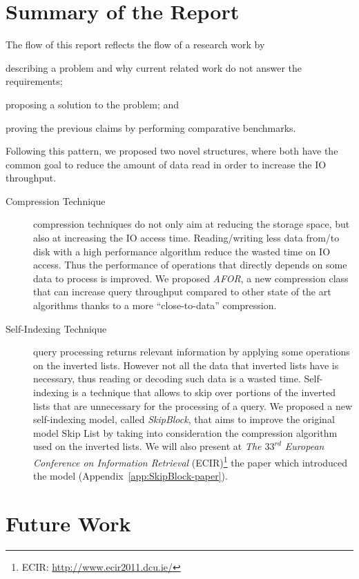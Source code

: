 \section{Summary of the Report}

The flow of this report reflects the flow of a research work by
\begin{inparaenum}[(1)]
\item describing a problem and why current related work do not answer the
requirements;
\item proposing a solution to the problem; and
\item proving the previous claims by performing comparative benchmarks.
\end{inparaenum}
Following this pattern, we proposed two novel structures, where both have the
common goal to reduce the amount of data read in order to increase the IO
throughput. 
\begin{description}
\item[Compression Technique] compression techniques do not only aim at reducing
the storage space, but also at increasing the IO access time. Reading/writing
less data from/to disk with a high performance algorithm reduce the wasted time
on IO access. Thus the performance of operations that directly depends on some
data to process is improved. We proposed \emph{AFOR}, a new compression class
that can increase query throughput compared to other state of the art
algorithms thanks to a more ``close-to-data'' compression.
\item[Self-Indexing Technique] query processing returns relevant information by
applying some operations on the inverted lists. However not all the data that
inverted lists have is necessary, thus reading or decoding such data is a
wasted time. Self-indexing is a technique that allows to skip over portions of
the inverted lists that are unnecessary for the processing of a query. We
proposed a new self-indexing model, called \emph{SkipBlock}, that aims to
improve the original model Skip List by taking into consideration the
compression algorithm used on the inverted lists. We will also present at
\emph{The $33^{rd}$ European Conference on Information Retrieval}
(ECIR)\footnote{ECIR: \url{http://www.ecir2011.dcu.ie/}} the paper which
introduced the model (Appendix~\ref{app:SkipBlock-paper}).
\end{description}

\section{Future Work}

